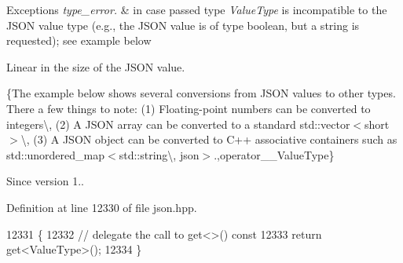 \begin{DoxyExceptions}{Exceptions}
{\em type\+\_\+error.} & in case passed type {\itshape Value\+Type} is incompatible to the J\+S\+ON value type (e.\+g., the J\+S\+ON value is of type boolean, but a string is requested); see example below\\
\hline
\end{DoxyExceptions}
Linear in the size of the J\+S\+ON value.

\{The example below shows several conversions from J\+S\+ON values to other types. There a few things to note\+: (1) Floating-\/point numbers can be converted to integers\textbackslash{}, (2) A J\+S\+ON array can be converted to a standard {\ttfamily std\+::vector$<$short$>$}\textbackslash{}, (3) A J\+S\+ON object can be converted to C++ associative containers such as {\ttfamily std\+::unordered\+\_\+map$<$std\+::string\textbackslash{}, json$>$}.,operator\+\_\+\+\_\+\+Value\+Type\}

\begin{DoxySince}{Since}
version 1.. 
\end{DoxySince}


Definition at line 12330 of file json.\+hpp.


\begin{DoxyCode}
12331     \{
12332         \textcolor{comment}{// delegate the call to get<>() const}
12333         \textcolor{keywordflow}{return} get<ValueType>();
12334     \}
\end{DoxyCode}
\mbox{\label{classnlohmann_1_1basic__json_aea1085f2d35cc0e1ce119cf0110119e6}} 
